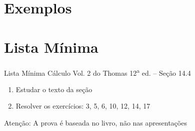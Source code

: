 \documentclass[fleqn,utf8,aspectratio=169,12pt,ignorenonframetext]{beamer}
\begin{document}


\section{Exemplos}






\section{Lista Mínima}

\begin{frame}{Lista Mínima}
  Cálculo Vol. 2 do Thomas 12\textsuperscript{a} ed. -- Seção 14.4
  \begin{enumerate}
    \item Estudar o texto da seção
    \item Resolver os exercícios: 3, 5, 6, 10, 12, 14, 17
  \end{enumerate}

  \vfill
  Atenção: A prova é baseada no livro, não nas apresentações
\end{frame}

\end{document}
